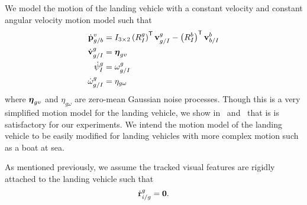 We model the motion of the landing vehicle
with a constant velocity and constant
angular velocity motion model such that
\begin{align}
  \dot{\boldsymbol{\mathrm{p}}}_{g/b}^{v} &= I_{3 \times 2} \left( R_{I}^{g} \right)^{\mathsf{T}}
   \boldsymbol{\mathrm{v}}_{g/I}^{g} - \left( R_{I}^{b} \right)^{\mathsf{T}}
  \boldsymbol{\mathrm{v}}_{b/I}^{b} \label{eq:goal_dynamics} \\
  \dot{\boldsymbol{\mathrm{v}}}_{g/I}^{g} &= \boldsymbol{\mathrm{\eta}}_{gv} \nonumber \\
  \dot{\psi}_{I}^{g} &= \omega_{g/I}^g \nonumber \\
  \dot{\omega}_{g/I}^{g} &= \eta_{g\omega} \nonumber
\end{align}
where $\boldsymbol{\mathrm{\eta}}_{gv}$ and $\eta_{g\omega}$ are zero-mean Gaussian noise
processes. Though this is a very simplified motion model for the landing
vehicle, we show in~ and~ that is is
satisfactory for our experiments. We intend the motion model of the landing
vehicle to be easily modified for landing vehicles with more complex motion such
as a boat at sea.

As mentioned previously, we assume the tracked visual features are rigidly
attached to the landing vehicle such that
\begin{equation}
  \dot{\boldsymbol{\mathrm{r}}}_{i/g}^g = \boldsymbol{\mathrm{0}}. \label{eq:feature_dynamics}
\end{equation}

